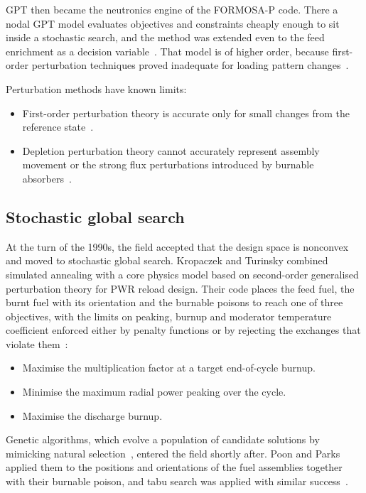GPT then became the neutronics engine of the FORMOSA-P code. There a
nodal GPT model evaluates objectives and constraints cheaply enough to
sit inside a stochastic search, and the method was extended even to the
feed enrichment as a decision variable~\cite{maldonado_1995}. That model
is of higher order, because first-order perturbation techniques proved
inadequate for loading pattern changes~\cite{maldonado_1995}.

Perturbation methods have known limits:

\begin{itemize}
  \item First-order perturbation theory is accurate only for small
        changes from the reference state~\cite{hobson_turinsky_1986}.

  \item Depletion perturbation theory cannot accurately represent
        assembly movement or the strong flux perturbations introduced
        by burnable absorbers~\cite{downar_1988}.
\end{itemize}

\subsection{Stochastic global search}
\label{sec:lit-opt-stochastic}

At the turn of the 1990s, the field accepted that the design space is
nonconvex and moved to stochastic global search. Kropaczek and Turinsky combined simulated annealing with a core physics
model based on second-order generalised perturbation theory for PWR
reload design. Their code places the feed fuel, the burnt fuel with its
orientation and the burnable poisons to reach one of three objectives,
with the limits on peaking, burnup and moderator temperature coefficient
enforced either by penalty functions or by rejecting the exchanges that
violate them~\cite{kropaczek_turinsky_1991}:

\begin{itemize}
  \item Maximise the multiplication factor at a target end-of-cycle
        burnup.

  \item Minimise the maximum radial power peaking over the cycle.

  \item Maximise the discharge burnup.
\end{itemize}

Genetic algorithms, which evolve a population of candidate solutions by
mimicking natural selection~\cite{deb_2001}, entered the field shortly
after. Poon and Parks applied them to the positions and orientations of
the fuel assemblies together with their burnable poison, and tabu search
was applied with similar success~\cite{meneses_2010}.

